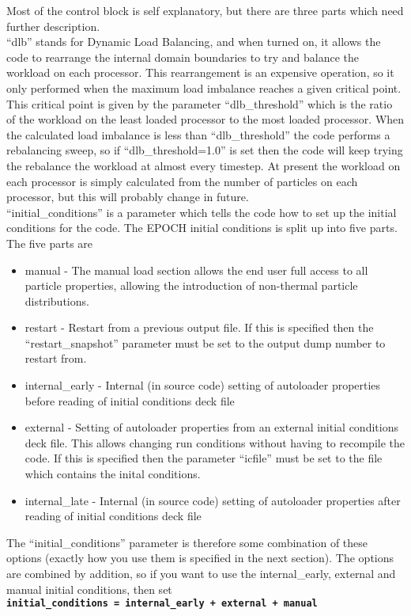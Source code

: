 \documentclass[12pt]{article}
\newcommand{\inlinecode}[1]{{\color{warwickred} \bf\texttt{#1}}}
\newcommand{\EPOCH}{{\color{warwickdark}\fontfamily{phv}\selectfont EPOCH} }
\begin{document}
Most of the control block is self explanatory, but there are three parts which
need further description. \\
``dlb'' stands for Dynamic Load Balancing, and when turned on, it allows the
code to rearrange the internal domain boundaries to try and balance the
workload on each processor. This rearrangement is an expensive operation, so
it only performed when the maximum load imbalance reaches a given critical
point. This critical point is given by the parameter ``dlb\_threshold'' which
is the ratio of the workload on the least loaded processor to the most loaded
processor. When the calculated load imbalance is less than ``dlb\_threshold''
the code performs a rebalancing sweep, so if ``dlb\_threshold=1.0'' is set
then the code will keep trying the rebalance the workload at almost every
timestep. At present the workload on each processor is simply calculated from
the number of particles on each processor, but this will probably change in
future.\\
``initial\_conditions'' is a parameter which tells the code how to set up the
initial conditions for the code. The \EPOCH initial conditions is split up
into five parts. The five parts are
\begin{itemize}
\item manual - The manual load section allows the end user full access to all
  particle properties, allowing the introduction of non-thermal particle
  distributions.
\item restart - Restart from a previous output file. If this is specified then
  the ``restart\_snapshot'' parameter must be set to the output dump number to
  restart from.
\item internal\_early - Internal (in source code) setting of autoloader
  properties before reading of initial conditions deck file
\item external - Setting of autoloader properties from an external initial
  conditions deck file. This allows changing run conditions without having to
  recompile the code. If this is specified then the parameter ``icfile'' must
  be set to the file which contains the inital conditions.
\item internal\_late - Internal (in source code) setting of autoloader
  properties after reading of initial conditions deck file
\end{itemize}
The ``initial\_conditions'' parameter is therefore some combination of these
options (exactly how you use them is specified in the next section). The
options are combined by addition, so if you want to use the internal\_early,
external and manual initial conditions, then set\\
\inlinecode{initial\_conditions = internal\_early + external + manual}\\
\end{document}
